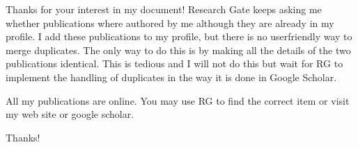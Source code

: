 \documentclass{article}
\begin{document}
Thanks for your interest in my document! Research Gate keeps asking me whether publications where
authored by me although they are already in my profile. I add these publications to my profile, but there is no userfriendly way to merge duplicates. The
only way to do this is by making all the details of the two publications identical. This is tedious
and I will not do this but wait for RG to implement the handling of duplicates in the way it is done in Google Scholar.

All my publications are online. You may use RG to find the correct item or visit my web site or
google scholar.

Thanks!
\end{document}
